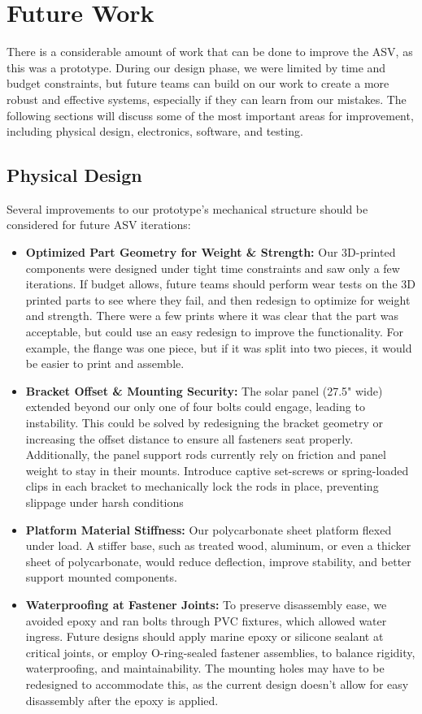 \section{Future Work}

There is a considerable amount of work that can be done to improve the ASV, as this was a prototype. During our design phase, we were limited by time and budget constraints, but future teams can build on our work to create a more robust and effective systems, especially if they can learn from our mistakes. The following sections will discuss some of the most important areas for improvement, including physical design, electronics, software, and testing. 

\subsection{Physical Design}

Several improvements to our prototype's mechanical structure should be considered for future ASV iterations:
\begin{itemize}
  \item \textbf{Optimized Part Geometry for Weight \& Strength:}  
    Our 3D-printed components were designed under tight time constraints and saw only a few iterations. If budget allows, future teams should perform wear tests on the 3D printed parts to see where they fail, and then redesign to optimize for weight and strength. There were a few prints where it was clear that the part was acceptable, but could use an easy redesign to improve the functionality. For example, the flange was one piece, but if it was split into two pieces, it would be easier to print and assemble.
  \item \textbf{Bracket Offset \& Mounting Security:}  
    The solar panel (27.5" wide) extended beyond our only one of four bolts could engage, leading to instability. This could be solved by redesigning the bracket geometry or increasing the offset distance to ensure all fasteners seat properly. Additionally, the panel support rods currently rely on friction and panel weight to stay in their mounts. Introduce captive set-screws or spring-loaded clips in each bracket to mechanically lock the rods in place, preventing slippage under harsh conditions    
  \item \textbf{Platform Material Stiffness:}  
    Our polycarbonate sheet platform flexed under load. A stiffer base, such as treated wood, aluminum, or even a thicker sheet of polycarbonate, would reduce deflection, improve stability, and better support mounted components.
  \item \textbf{Waterproofing at Fastener Joints:}  
    To preserve disassembly ease, we avoided epoxy and ran bolts through PVC fixtures, which allowed water ingress. Future designs should apply marine epoxy or silicone sealant at critical joints, or employ O-ring-sealed fastener assemblies, to balance rigidity, waterproofing, and maintainability. The mounting holes may have to be redesigned to accommodate this, as the current design doesn't allow for easy disassembly after the epoxy is applied.
\end{itemize}

